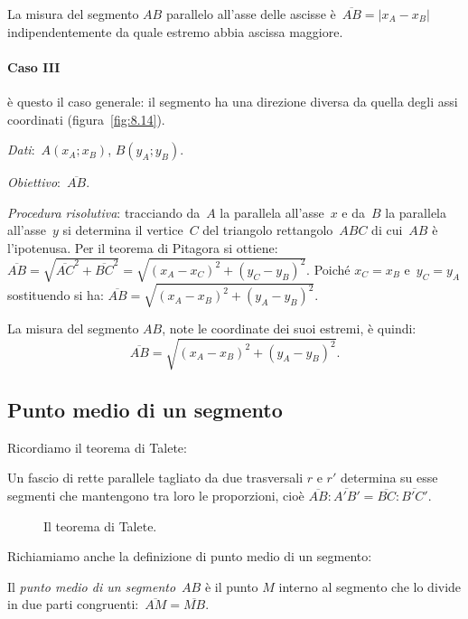 La misura del segmento $AB$ parallelo all'asse delle ascisse è~$\overline{AB}=|x_{A}-x_{B}|$
indipendentemente da quale estremo abbia ascissa maggiore.

\paragraph{Caso III} è questo il caso generale: il segmento ha una direzione diversa da quella degli assi coordinati (figura~\ref{fig:8.14}).

\emph{Dati}:~$A(x_A;x_B)$, $B(y_A;y_B)$.

\emph{Obiettivo}:~$\overline{AB}$.

\emph{Procedura risolutiva}: tracciando da~$A$ la parallela all'asse~$x$ e da~$B$ la parallela all'asse~$y$
si determina il vertice~$C$ del triangolo rettangolo~$ABC$ di cui~$AB$ è l'ipotenusa.
Per il teorema di Pitagora si ottiene:~$\overline{AB}=\sqrt{\overline{AC}^2 + \overline{BC}^2}=\sqrt{\left(x_A-x_C \right)^2+
\left(y_C-y_B \right)^2}$. %
Poiché $x_{C}=x_{B}$ e~$y_{C}=y_{A}$ sostituendo si ha:
$\overline{AB}=\sqrt{\left(x_{A}-x_{B}\right)^{2}+\left(y_{A}-y_{B}\right)^{2}}$.

La misura del segmento $AB$, note le coordinate dei suoi estremi, è quindi:
\[\overline{AB}=\sqrt{\left(x_{A}-x_{B}\right)^{2}+\left(y_{A}-y_{B}\right)^{2}}.\]

\ovalbox{\risolvii  \ref{ese:8.21}, \ref{ese:8.22}, \ref{ese:8.23}, \ref{ese:8.24}, \ref{ese:8.25}, \ref{ese:8.26},
\ref{ese:8.27}, \ref{ese:8.28}, \ref{ese:8.29}, \ref{ese:8.30}, \ref{ese:8.31}, \ref{ese:8.32}, \ref{ese:8.33}}
\pagebreak
\subsection{Punto medio di un segmento}
Ricordiamo il teorema di Talete:

\begin{teorema}[di Talete]
Un fascio di rette parallele tagliato da due trasversali $r$ e $r'$ determina su esse segmenti che mantengono tra loro le proporzioni, cioè $\overline{AB}:\overline{A'B'}=\overline{BC}:\overline{B'C'}$.
\end{teorema}

\begin{figure}[h]
 \centering
 \caption{Il teorema di Talete.}\label{fig:8.15}
 \end{figure}

Richiamiamo anche la definizione di punto medio di un segmento:
\begin{definizione}
 Il \emph{punto medio di un segmento}~$AB$ è il punto $M$ interno
al segmento che lo divide in due parti congruenti:~$\overline{AM}=\overline{MB}$.
\end{definizione}

